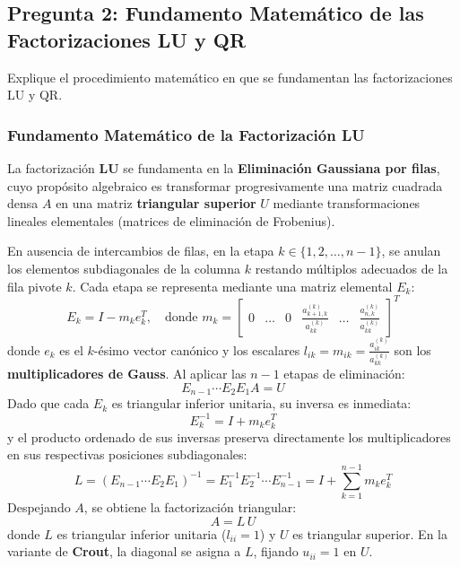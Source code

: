 \documentclass[11pt,a4paper]{article}
\theoremstyle{definition}
\theoremstyle{remark}
\begin{document}
\subsection{Pregunta 2: Fundamento Matemático de las Factorizaciones LU y QR}

\begin{solbox}[Pregunta 2]
Explique el procedimiento matemático en que se fundamentan las factorizaciones LU y QR.
\end{solbox}

\subsubsection{Fundamento Matemático de la Factorización LU}
La factorización $\mathbf{LU}$ se fundamenta en la \textbf{Eliminación Gaussiana por filas}, cuyo propósito algebraico es transformar progresivamente una matriz cuadrada densa $A$ en una matriz \textbf{triangular superior} $U$ mediante transformaciones lineales elementales (matrices de eliminación de Frobenius).

En ausencia de intercambios de filas, en la etapa $k \in \{1, 2, \dots, n-1\}$, se anulan los elementos subdiagonales de la columna $k$ restando múltiplos adecuados de la fila pivote $k$. Cada etapa se representa mediante una matriz elemental $E_k$:
\begin{equation}
    E_k = I - m_k e_k^T, \quad \text{donde } m_k = \begin{bmatrix} 0 & \dots & 0 & \frac{a_{k+1, k}^{(k)}}{a_{kk}^{(k)}} & \dots & \frac{a_{n, k}^{(k)}}{a_{kk}^{(k)}} \end{bmatrix}^T
\end{equation}
donde $e_k$ es el $k$-ésimo vector canónico y los escalares $l_{ik} = m_{ik} = \frac{a_{ik}^{(k)}}{a_{kk}^{(k)}}$ son los \textbf{multiplicadores de Gauss}. Al aplicar las $n-1$ etapas de eliminación:
\begin{equation}
    E_{n-1} \cdots E_2 E_1 A = U
\end{equation}
Dado que cada $E_k$ es triangular inferior unitaria, su inversa es inmediata:
\begin{equation}
    E_k^{-1} = I + m_k e_k^T
\end{equation}
y el producto ordenado de sus inversas preserva directamente los multiplicadores en sus respectivas posiciones subdiagonales:
\begin{equation}
    L = (E_{n-1} \cdots E_2 E_1)^{-1} = E_1^{-1} E_2^{-1} \cdots E_{n-1}^{-1} = I + \sum_{k=1}^{n-1} m_k e_k^T
\end{equation}
Despejando $A$, se obtiene la factorización triangular:
\begin{equation}
    A = L \, U
\end{equation}
donde $L$ es triangular inferior unitaria ($l_{ii} = 1$) y $U$ es triangular superior. En la variante de \textbf{Crout}, la diagonal se asigna a $L$, fijando $u_{ii} = 1$ en $U$.
\end{document}

